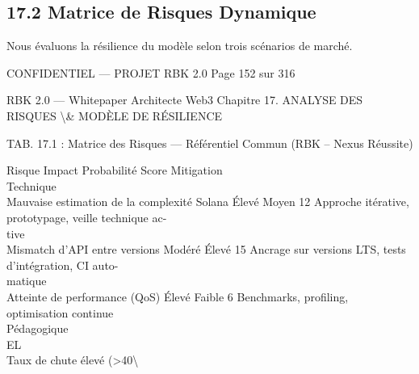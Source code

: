 \documentclass[12pt,landscape,a4paper]{article}
\newenvironment{confidential}
{\begin{tcolorbox}[
    colback=rbkred!5!white,
    colframe=rbkred!75!black,
    title=CONFIDENTIEL,
    fonttitle=\bfseries\color{white},
    coltitle=rbkred!75!black,
    breakable,
    enhanced,
    frame hidden,
    borderline west={2pt}{0pt}{rbkred!75!black}
]}
{\end{tcolorbox}}
\begin{document}
\subsection{17.2 Matrice de Risques Dynamique}
Nous évaluons la résilience du modèle selon trois scénarios de marché.\\
\vspace{0.5em}
\vspace{0.5em}
\vspace{0.5em}
\vspace{0.5em}
\begin{confidential}CONFIDENTIEL — PROJET RBK 2.0                               Page 152 sur 316\end{confidential}
RBK 2.0 — Whitepaper Architecte Web3                                        Chapitre 17. ANALYSE DES RISQUES \textbackslash{}& MODÈLE DE RÉSILIENCE\\
\vspace{0.5em}
\vspace{0.5em}
\begin{center}\begin{tabular}TAB. 17.1 : Matrice des Risques — Référentiel Commun (RBK – Nexus Réussite)\end{tabular}\end{center}
\vspace{0.5em}
\vspace{0.5em}
Risque                                               Impact Probabilité Score Mitigation\\
Technique\\
Mauvaise estimation de la complexité Solana           Élevé     Moyen         12   Approche itérative, prototypage, veille technique ac-\\
tive\\
Mismatch d’API entre versions                        Modéré      Élevé        15   Ancrage sur versions LTS, tests d’intégration, CI auto-\\
matique\\
Atteinte de performance (QoS)                         Élevé     Faible        6    Benchmarks, profiling, optimisation continue\\
Pédagogique\\
\vspace{0.5em}
\vspace{0.5em}
\vspace{0.5em}
\vspace{0.5em}
EL\\
Taux de chute élevé (\textgreater{}40\textbackslash{}%
\end{document}

